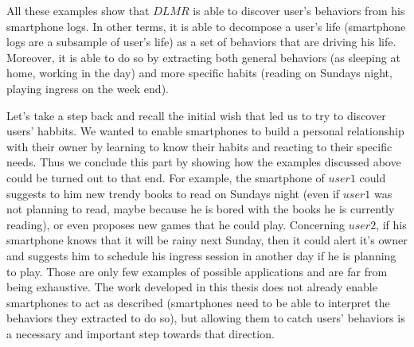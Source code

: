 All these examples show that $DLMR$ is able to discover user's behaviors from his smartphone logs. In other terms, it is able to decompose a user's life (smartphone logs are a subsample of user's life) as a set of behaviors that are driving his life. Moreover, it is able to do so by extracting both general behaviors (as sleeping at home, working in the day) and more specific habits (reading on Sundays night, playing ingress on the week end). \par

Let's take a step back and recall the initial wish that led us to try to discover users' habbits. We wanted to enable smartphones to build a personal relationship with their owner by learning to know their habits and reacting to their specific needs. Thus we conclude this part by showing how the examples discussed above could be turned out to that end. For example, the smartphone of $user1$ could suggests to him new trendy books to read on Sundays night (even if $user1$ was not planning to read, maybe because he is bored with the books he is currently reading), or even proposes new games that he could play. Concerning $user2$, if his smartphone knows that it will be rainy next Sunday, then it could alert it's owner and suggests him to schedule his ingress session in another day if he is planning to play. Those are only few examples of possible applications and are far from being exhaustive. The work developed in this thesis does not already enable smartphones to act as described (smartphones need to be able to interpret the behaviors they extracted to do so), but allowing them to catch users' behaviors is a necessary and important step towards that direction.

